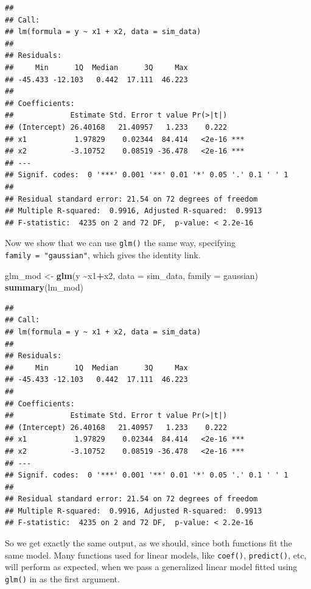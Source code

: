 \documentclass[
]{book}
\newenvironment{Shaded}{\begin{snugshade}}{\end{snugshade}}
\newcommand{\DataTypeTok}[1]{\textcolor[rgb]{0.13,0.29,0.53}{#1}}
\newcommand{\KeywordTok}[1]{\textcolor[rgb]{0.13,0.29,0.53}{\textbf{#1}}}
\newcommand{\NormalTok}[1]{#1}
\newcommand{\OperatorTok}[1]{\textcolor[rgb]{0.81,0.36,0.00}{\textbf{#1}}}
\newcommand{\StringTok}[1]{\textcolor[rgb]{0.31,0.60,0.02}{#1}}
\begin{document}
\begin{verbatim}
## 
## Call:
## lm(formula = y ~ x1 + x2, data = sim_data)
## 
## Residuals:
##     Min      1Q  Median      3Q     Max 
## -45.433 -12.103   0.442  17.111  46.223 
## 
## Coefficients:
##             Estimate Std. Error t value Pr(>|t|)    
## (Intercept) 26.40168   21.40957   1.233    0.222    
## x1           1.97829    0.02344  84.414   <2e-16 ***
## x2          -3.10752    0.08519 -36.478   <2e-16 ***
## ---
## Signif. codes:  0 '***' 0.001 '**' 0.01 '*' 0.05 '.' 0.1 ' ' 1
## 
## Residual standard error: 21.54 on 72 degrees of freedom
## Multiple R-squared:  0.9916, Adjusted R-squared:  0.9913 
## F-statistic:  4235 on 2 and 72 DF,  p-value: < 2.2e-16
\end{verbatim}

Now we show that we can use \texttt{glm()} the same way, specifying \texttt{family\ =\ "gaussian"}, which gives the identity link.

\begin{Shaded}
\begin{Highlighting}[]
\NormalTok{glm\_mod \textless{}{-}}\StringTok{ }\KeywordTok{glm}\NormalTok{(y }\OperatorTok{\textasciitilde{}}\NormalTok{x1}\OperatorTok{+}\NormalTok{x2, }\DataTypeTok{data =}\NormalTok{ sim\_data, }\DataTypeTok{family =}\NormalTok{ gaussian)}
\KeywordTok{summary}\NormalTok{(lm\_mod)}
\end{Highlighting}
\end{Shaded}

\begin{verbatim}
## 
## Call:
## lm(formula = y ~ x1 + x2, data = sim_data)
## 
## Residuals:
##     Min      1Q  Median      3Q     Max 
## -45.433 -12.103   0.442  17.111  46.223 
## 
## Coefficients:
##             Estimate Std. Error t value Pr(>|t|)    
## (Intercept) 26.40168   21.40957   1.233    0.222    
## x1           1.97829    0.02344  84.414   <2e-16 ***
## x2          -3.10752    0.08519 -36.478   <2e-16 ***
## ---
## Signif. codes:  0 '***' 0.001 '**' 0.01 '*' 0.05 '.' 0.1 ' ' 1
## 
## Residual standard error: 21.54 on 72 degrees of freedom
## Multiple R-squared:  0.9916, Adjusted R-squared:  0.9913 
## F-statistic:  4235 on 2 and 72 DF,  p-value: < 2.2e-16
\end{verbatim}

So we get exactly the same output, as we should, since both functions fit the same model. Many functions used for linear models, like \texttt{coef()}, \texttt{predict()}, etc, will perform as expected, when we pass a generalized linear model fitted using \texttt{glm()} in as the first argument.
\end{document}
